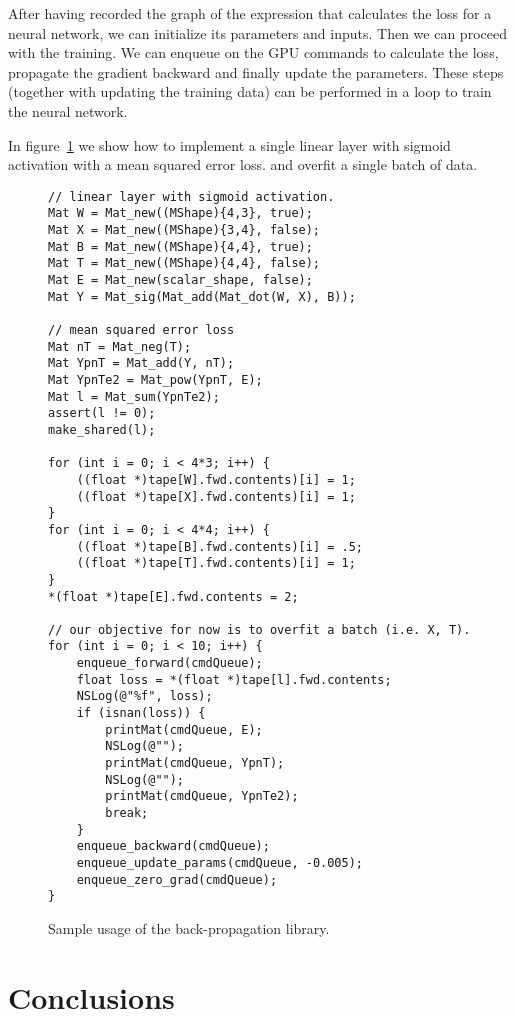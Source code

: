\documentclass{sapthesis}
\begin{document}
After having recorded the graph of the expression that calculates the loss for a
neural network, we can initialize its parameters and inputs. Then we can proceed
with the training. We can enqueue on the GPU commands to calculate the loss,
propagate the gradient backward and finally update the parameters. These
steps (together with updating the training data) can be performed in a loop to
train the neural network.

In figure~\ref{fig:sample-code} we show how to implement a single linear layer
with sigmoid activation with a mean squared error loss. and overfit a single
batch of data.

\begin{figure}
\begin{footnotesize}
\begin{verbatim}
// linear layer with sigmoid activation.
Mat W = Mat_new((MShape){4,3}, true);
Mat X = Mat_new((MShape){3,4}, false);
Mat B = Mat_new((MShape){4,4}, true);
Mat T = Mat_new((MShape){4,4}, false);
Mat E = Mat_new(scalar_shape, false);
Mat Y = Mat_sig(Mat_add(Mat_dot(W, X), B)); 

// mean squared error loss
Mat nT = Mat_neg(T);
Mat YpnT = Mat_add(Y, nT);
Mat YpnTe2 = Mat_pow(YpnT, E);
Mat l = Mat_sum(YpnTe2);
assert(l != 0);
make_shared(l);

for (int i = 0; i < 4*3; i++) {
    ((float *)tape[W].fwd.contents)[i] = 1;
    ((float *)tape[X].fwd.contents)[i] = 1;
}
for (int i = 0; i < 4*4; i++) {
    ((float *)tape[B].fwd.contents)[i] = .5;
    ((float *)tape[T].fwd.contents)[i] = 1;
}
*(float *)tape[E].fwd.contents = 2;

// our objective for now is to overfit a batch (i.e. X, T).
for (int i = 0; i < 10; i++) {
    enqueue_forward(cmdQueue);
    float loss = *(float *)tape[l].fwd.contents;
    NSLog(@"%f", loss);
    if (isnan(loss)) {
        printMat(cmdQueue, E);
        NSLog(@"");
        printMat(cmdQueue, YpnT);
        NSLog(@"");
        printMat(cmdQueue, YpnTe2);
        break;
    }
    enqueue_backward(cmdQueue);
    enqueue_update_params(cmdQueue, -0.005);
    enqueue_zero_grad(cmdQueue);
}
\end{verbatim}
\end{footnotesize}
\caption{Sample usage of the back-propagation library.}
\label{fig:sample-code}
\end{figure}

\chapter*{Conclusions}
\end{document}
